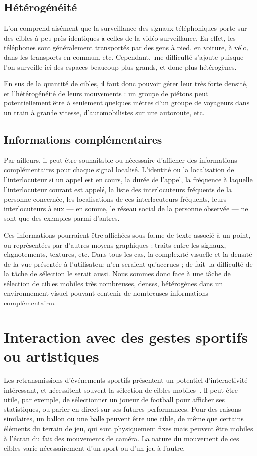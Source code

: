 	
	\subsection{Hétérogénéité}
	L'on comprend aisément que la surveillance des signaux téléphoniques porte sur des cibles à peu près identiques à celles de la vidéo-surveillance. En effet, les téléphones sont généralement transportés par des gens à pied, en voiture, à vélo, dans les transports en commun, etc. Cependant, une difficulté s'ajoute puisque l'on surveille ici des espaces beaucoup plus grands, et donc plus hétérogènes.
	
	En sus de la quantité de cibles, il faut donc pouvoir gérer leur très forte densité, et l'hétérogénéité de leurs mouvements : un groupe de piétons peut potentiellement être à seulement quelques mètres d'un groupe de voyageurs dans un train à grande vitesse, d'automobilistes sur une autoroute, etc.
	
	\subsection{Informations complémentaires}
	Par ailleurs, il peut être souhaitable ou nécessaire d'afficher des informations complémentaires pour chaque signal localisé. L'identité ou la localisation de l'interlocuteur si un appel est en cours, la durée de l'appel, la fréquence à laquelle l'interlocuteur courant est appelé, la liste des interlocuteurs fréquents de la personne concernée, les localisations de ces interlocuteurs fréquents, leurs interlocuteurs à eux — en somme, le réseau social de la personne observée — ne sont que des exemples parmi d'autres.
	
	Ces informations pourraient être affichées sous forme de texte associé à un point, ou représentées par d'autres moyens graphiques : traits entre les signaux, clignotements, textures, etc. Dans tous les cas, la complexité visuelle et la densité de la vue présentée à l'utilisateur n'en seraient qu'accrues ; de fait, la difficulté de la tâche de sélection le serait aussi. Nous sommes donc face à une tâche de sélection de cibles mobiles très nombreuses, denses, hétérogènes dans un environnement visuel pouvant contenir de nombreuses informations complémentaires.
	
	\section{Interaction avec des gestes sportifs ou artistiques}	
	Les retransmissions d'événements sportifs présentent un potentiel d'interactivité intéressant, et nécessitent souvent la sélection de cibles mobiles~\cite{ilich2010moving}. Il peut être utile, par exemple, de sélectionner un joueur de football pour afficher ses statistiques, ou parier en direct sur ses futures performances. Pour des raisons similaires, un ballon ou une balle peuvent être une cible, de même que certains éléments du terrain de jeu, qui sont physiquement fixes mais peuvent être mobiles à l'écran du fait des mouvements de caméra. La nature du mouvement de ces cibles varie nécessairement d'un sport ou d'un jeu à l'autre.
	
